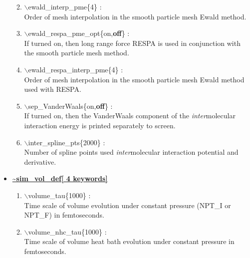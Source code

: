 \begin{itemize}
\begin{enumerate}
 \vspace{0.15in} \Large
 \item   $\backslash$ewald\_interp\_pme\{4\} : \\
   \large
   Order of mesh interpolation in the smooth particle mesh Ewald method.

 \vspace{0.15in} \Large
 \item   $\backslash$ewald\_respa\_pme\_opt\{on,{\bf off}\} : \\
  \large
  If turned on, then long range force RESPA is used in conjunction with the
  smooth particle mesh method.

 \vspace{0.15in} \Large
 \item   $\backslash$ewald\_respa\_interp\_pme\{4\} : \\
  \large
  Order of mesh interpolation in the smooth particle mesh Ewald method used
  with RESPA.

 \vspace{0.15in}\Large
 \item   $\backslash$sep\_VanderWaals\{on,{\bf off}\} : \\
   \large
   If turned on, then the VanderWaals component of the {\it inter}molecular 
   interaction energy is printed separately to screen.

 \vspace{0.15in} \Large
 \item   $\backslash$inter\_spline\_pts\{2000\} : \\
   \large
    Number of spline points used {\it inter}molecular interaction 
    potential and derivative.

\end{enumerate}


\clearpage
\huge
\item[] \underline{\bf \~{}sim\_vol\_def[ 4 keywords]}
\begin{enumerate}

 \vspace{0.15in} \Large
 \item  $\backslash$volume\_tau\{1000\} : \\
    \large
     Time scale of volume evolution
     under constant pressure (NPT\_I or NPT\_F) in femtoseconds.
  
 \vspace{0.15in} \Large
 \item  $\backslash$volume\_nhc\_tau\{1000\} : \\
    \large
     Time scale of volume 
     heat bath evolution under constant pressure in femtoseconds.


\end{enumerate}
\end{itemize}
